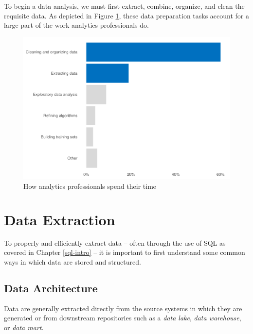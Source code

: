 \documentclass[
]{book}
\begin{document}
To begin a data analysis, we must first extract, combine, organize, and clean the requisite data. As depicted in Figure \ref{fig:analytics-tasks}, these data preparation tasks account for a large part of the work analytics professionals do.

\begin{figure}

{\centering \includegraphics[width=1\linewidth]{The_Fundamentals_of_People_Analytics_files/figure-latex/analytics-tasks-1} 

}

\caption{How analytics professionals spend their time}\label{fig:analytics-tasks}
\end{figure}

\hypertarget{data-extraction}{%
\section{Data Extraction}\label{data-extraction}}

To properly and efficiently extract data -- often through the use of SQL as covered in Chapter \ref{sql-intro} -- it is important to first understand some common ways in which data are stored and structured.

\hypertarget{data-architecture}{%
\subsection{Data Architecture}\label{data-architecture}}

Data are generally extracted directly from the source systems in which they are generated or from downstream repositories such as a \emph{data lake}, \emph{data warehouse}, or \emph{data mart}.
\end{document}
